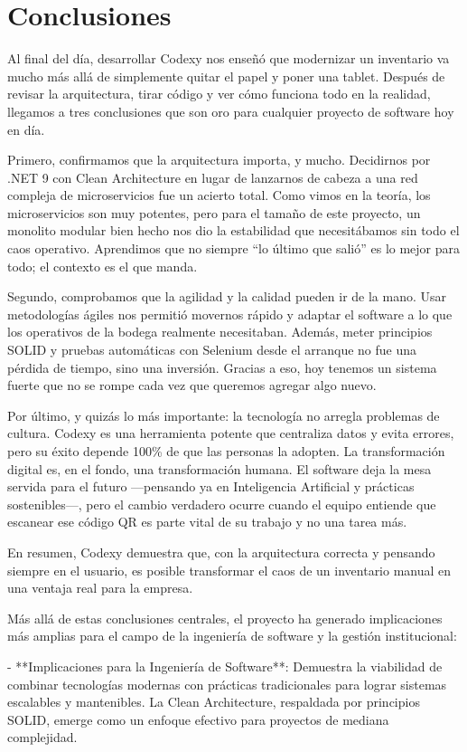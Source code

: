\section{Conclusiones}
Al final del día, desarrollar Codexy nos enseñó que modernizar un inventario va mucho más allá de simplemente quitar el papel y poner una tablet. Después de revisar la arquitectura, tirar código y ver cómo funciona todo en la realidad, llegamos a tres conclusiones que son oro para cualquier proyecto de software hoy en día.

Primero, confirmamos que la arquitectura importa, y mucho. Decidirnos por .NET 9 con Clean Architecture en lugar de lanzarnos de cabeza a una red compleja de microservicios fue un acierto total. Como vimos en la teoría, los microservicios son muy potentes, pero para el tamaño de este proyecto, un monolito modular bien hecho nos dio la estabilidad que necesitábamos sin todo el caos operativo. Aprendimos que no siempre ``lo último que salió'' es lo mejor para todo; el contexto es el que manda.

Segundo, comprobamos que la agilidad y la calidad pueden ir de la mano. Usar metodologías ágiles nos permitió movernos rápido y adaptar el software a lo que los operativos de la bodega realmente necesitaban. Además, meter principios SOLID y pruebas automáticas con Selenium desde el arranque no fue una pérdida de tiempo, sino una inversión. Gracias a eso, hoy tenemos un sistema fuerte que no se rompe cada vez que queremos agregar algo nuevo.

Por último, y quizás lo más importante: la tecnología no arregla problemas de cultura. Codexy es una herramienta potente que centraliza datos y evita errores, pero su éxito depende 100\% de que las personas la adopten. La transformación digital es, en el fondo, una transformación humana. El software deja la mesa servida para el futuro —pensando ya en Inteligencia Artificial y prácticas sostenibles—, pero el cambio verdadero ocurre cuando el equipo entiende que escanear ese código QR es parte vital de su trabajo y no una tarea más.

En resumen, Codexy demuestra que, con la arquitectura correcta y pensando siempre en el usuario, es posible transformar el caos de un inventario manual en una ventaja real para la empresa.

Más allá de estas conclusiones centrales, el proyecto ha generado implicaciones más amplias para el campo de la ingeniería de software y la gestión institucional:

- **Implicaciones para la Ingeniería de Software**: Demuestra la viabilidad de combinar tecnologías modernas con prácticas tradicionales para lograr sistemas escalables y mantenibles. La Clean Architecture, respaldada por principios SOLID, emerge como un enfoque efectivo para proyectos de mediana complejidad.

